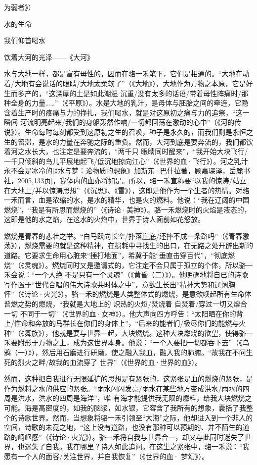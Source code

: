 \documentclass{article}
\begin{document}
\newpage
为弱者》） 


    水的生命 


    我们仰首喝水 


    饮着大河的光泽——《大河》 

水与大地一样，都是富有母性的，因而在骆一禾笔下，它们是相通的。“大地在动着/大地有会说话的眼睛/大地太柔软了”（《大地》），大地作为万物之本原，它是好生而多产的，“这深厚的土是如此潮湿  沉重/没有太多的话语/带着母性阵痛时/那种全身的力量……”（《平原》）。水是大地的乳汁，是母体与胚胎之间的牵连，它隐含着生产时的疼痛与力的挣扎，我们喝水，就是对这原初之痛与力的追祭，“这一瞬间  河流明亮起来/我们的身躯轰然作响/一切都回荡在激动的心中”（《河的传说》）。生命每时每刻都受到这原初之生的召唤，种子是永久的，而我们则是永恒之生的留滞，是水的力量在奔驰之际的重负。然而，大河到底是要奔流的，我们都饮着河之水长大，也注定是要奔流的，“两千只
\newpage
眼睛同时醒来”，“我开始大块飞行/一千只倾斜的鸟儿平展地起飞/低沉地掠向江心”（《世界的血·飞行》）。河之乳汁永不会是冰冷的[《水与梦：论物质的想象》加斯东·巴什拉著，顾嘉琛译，岳麓书社，2005,133页]，我体内的血亦将如是。所以，骆一禾宣称要“以我的惊涛/站立在大地上/并以惊涛思想”（《沉思》、《雪》），这即是他作为一个生者的热情。对骆一禾而言，血是浓缩的水，是水的精华，也是火的燃料。他说：“我在辽阔的中国燃烧”，“我是有所思而燃烧的”（《诗论·美神》）。骆一禾燃烧时的火焰是液态的，这即是他的水之焰，在这水的火焰中，世界于诗人面前如花怒放。
 

燃烧是青春的悲壮之举。“白马跃向长空/扑落崖底/还摔不成一条路吗”（《青春激荡》），燃烧需要的就是这种精神，在损耗中寻找生的出口，在无路之处开辟出新的道路。它要求生命用心脏来“捶打地面”，希冀于能“垂直击穿百代”，“彻底燃烧”（《灵魂》）。燃烧同时又是邀请式的，它注定不会只属于孤立的个体，所以骆一禾会说：“一个人绝
\newpage
不是只有一个灵魂”（《黄昏（二）》）。他明确地将自已的诗歌写作置于“世代合唱的伟大诗歌共时体之中”，意欲生长出“精神大势和辽阔胸怀”（《诗论·火光》）。骆一禾的燃烧是人类整体式的燃烧，是意欲唤起所有生命体普燃之势的燃烧，“我就是大地上的  炽热的火焰/焚烧着  自焚着/穿过一切又熔合一切  不同于一切”（《世界的血·女神》）。他大声向四方呼告：“太阳晒在你的背上/性命和奔放的马群长在你们的身体上”，“后来的能者们/极尽你们的能燃与火种”（《舞族》），他就是要与世界一起，大块燃烧。这种大块燃烧的欲望，使得骆一禾要附形于万物之上，成为这世界本身。他说：“一个人要把一切都吞下去”（《乌鸦（一）》），然后用石磨进行研磨，使之融入我血，融入我的肺腑。“故我在不问生死的烈火之畔/故我的血流穿了
世界”（《世界的血·世界的血》）。 

然而，这种把自我进行无限延扩的思想是有紧张的，这紧张是血的燃烧的紧张，是作为燃料之水的供应的紧张。“雨水闪闪发亮/雨水在某些地方变成洪水/雨水的四周是洪水，洪水的四周是海洋”，唯
\newpage
有海才能提供我无限的燃料，给我大块燃烧之可能。海是高密度的，如我的脑浆，如水银，它容含了我所有的想象，囊括了我整个的诗歌世界。然而，当想象将骆一禾引领至“大海”之际，他却进入到一个非人的空间，诗歌的未竟之地，“这上没有道路，也没有那种可以预期的、并不陌生的道路的崎岖感”（《诗论·火光》）。骆一禾将自我与世界合一，却又与此同时迷失了世界，也迷失了自我。我在哪里？诗人如此追问。在这生之紧张中，骆一禾说：“我愿有一个人的面容/关注世界，并自我恢复”（《世界的血·
梦幻》）。 
\end{document}
